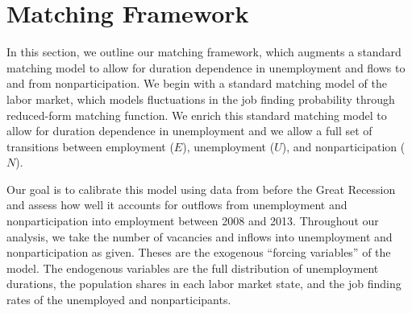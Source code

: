 \documentclass[12pt]{article}
\theoremstyle{definition}
\begin{document}

\section{Matching Framework}

In this section, we outline our matching framework, which augments a standard matching model to allow for duration dependence in unemployment and flows to and from nonparticipation. We begin with a standard matching model of the labor market, which models fluctuations in the job finding probability through reduced-form matching function. We enrich this standard matching model to allow for duration dependence in unemployment and we allow a full set of transitions between employment ($E$), unemployment ($U$), and nonparticipation ($N$).

Our goal is to calibrate this model using data from before the Great Recession and assess how well it accounts for outflows from unemployment and nonparticipation into employment between 2008 and 2013. Throughout our analysis, we take the number of vacancies and inflows into unemployment and nonparticipation as given. Theses are the exogenous ``forcing variables'' of the model. The endogenous variables are the full distribution of unemployment durations, the population shares in each labor market state, and the job finding rates of the unemployed and nonparticipants.
\end{document}
